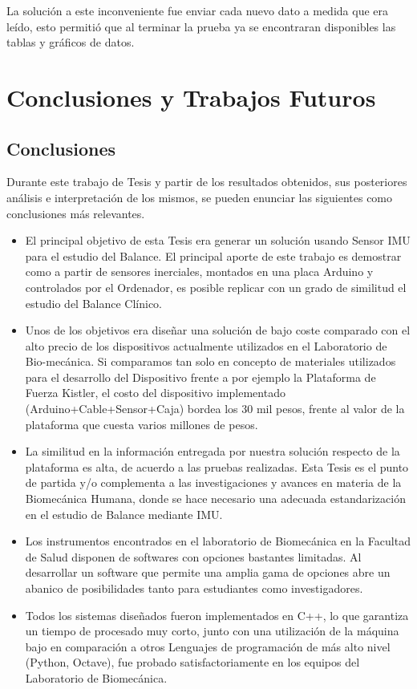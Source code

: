 \documentclass[12pt,a4paper]{article}
\begin{document}
La solución a este inconveniente fue enviar cada nuevo dato a medida que era leído, esto permitió que al terminar la prueba ya se encontraran disponibles las tablas y gráficos de datos.

\section{Conclusiones y Trabajos Futuros}
\subsection{Conclusiones}
Durante este trabajo de Tesis y partir de los resultados obtenidos, sus posteriores análisis e interpretación de los mismos, se pueden enunciar las siguientes como conclusiones más relevantes.
\begin{itemize}
	\item El principal objetivo de esta Tesis era generar un solución usando Sensor IMU para el estudio del Balance. El principal aporte de este trabajo es demostrar como a partir de sensores inerciales, montados en una placa Arduino y controlados por el Ordenador, es posible replicar con un grado de similitud el estudio del Balance Clínico.
	
	\item Unos de los objetivos era diseñar una solución de bajo coste comparado con el alto precio de los dispositivos actualmente utilizados en el Laboratorio de Bio-mecánica. Si comparamos tan solo en concepto de materiales utilizados para el desarrollo del Dispositivo frente a por ejemplo la Plataforma de Fuerza Kistler, el costo del dispositivo implementado (Arduino+Cable+Sensor+Caja) bordea los 30 mil pesos, frente al valor de la plataforma que cuesta varios millones de pesos.
			
	\item La similitud en la información entregada por nuestra solución respecto de la plataforma es alta, de acuerdo a las pruebas realizadas. Esta Tesis es el punto de partida y/o complementa a las investigaciones y avances en materia de la Biomecánica Humana, donde se hace necesario una adecuada estandarización en el estudio de Balance mediante IMU.
	
	\item Los instrumentos encontrados en el laboratorio de Biomecánica en la Facultad de Salud disponen de softwares con opciones bastantes limitadas. Al desarrollar un software que permite una amplia gama de opciones abre un abanico de posibilidades tanto para estudiantes como investigadores.
	
	\item Todos los sistemas diseñados fueron implementados en C++, lo que garantiza un tiempo de procesado muy corto, junto con una utilización de la máquina bajo en comparación a otros Lenguajes de programación de más alto nivel (Python, Octave), fue probado satisfactoriamente en los equipos del Laboratorio de Biomecánica.
\end{itemize} 
\end{document}
